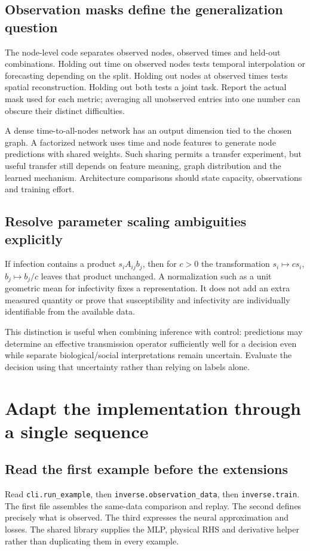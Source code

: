 \documentclass[11pt,a4paper]{article}
\theoremstyle{definition}
\theoremstyle{remark}
\begin{document}
\subsection{Observation masks define the generalization question}
The node-level code separates observed nodes, observed times and held-out combinations. Holding out time on observed nodes tests temporal interpolation or forecasting depending on the split. Holding out nodes at observed times tests spatial reconstruction. Holding out both tests a joint task. Report the actual mask used for each metric; averaging all unobserved entries into one number can obscure their distinct difficulties.

A dense time-to-all-nodes network has an output dimension tied to the chosen graph. A factorized network uses time and node features to generate node predictions with shared weights. Such sharing permits a transfer experiment, but useful transfer still depends on feature meaning, graph distribution and the learned mechanism. Architecture comparisons should state capacity, observations and training effort.

\subsection{Resolve parameter scaling ambiguities explicitly}
If infection contains a product $s_iA_{ij}b_j$, then for $c>0$ the transformation
$s_i\mapsto cs_i$, $b_j\mapsto b_j/c$ leaves that product unchanged. A normalization such as a unit geometric mean for infectivity fixes a representation. It does not add an extra measured quantity or prove that susceptibility and infectivity are individually identifiable from the available data.

This distinction is useful when combining inference with control: predictions may determine an effective transmission operator sufficiently well for a decision even while separate biological/social interpretations remain uncertain. Evaluate the decision using that uncertainty rather than relying on labels alone.

\section{Adapt the implementation through a single sequence}
\subsection{Read the first example before the extensions}
Read \texttt{cli.run\_example}, then \texttt{inverse.observation\_data}, then \texttt{inverse.train}. The first file assembles the same-data comparison and replay. The second defines precisely what is observed. The third expresses the neural approximation and losses. The shared library supplies the MLP, physical RHS and derivative helper rather than duplicating them in every example.
\end{document}
